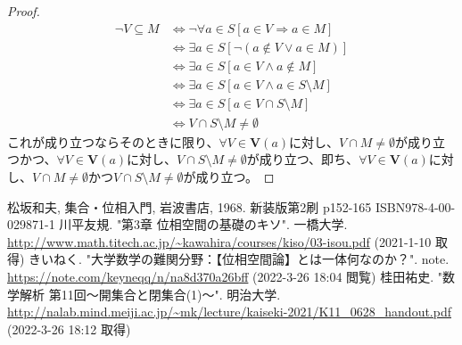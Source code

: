 \documentclass[dvipdfmx]{jsarticle}
\begin{document}
\begin{proof}
\begin{align*}
\neg V \subseteq M &\Leftrightarrow \neg\forall a \in S[ a \in V \Rightarrow a \in M]\\
&\Leftrightarrow \exists a \in S\left[ \neg(a \notin V \vee a \in M) \right]\\
&\Leftrightarrow \exists a \in S[ a \in V \land a \notin M]\\
&\Leftrightarrow \exists a \in S[ a \in V \land a \in S \setminus M]\\
&\Leftrightarrow \exists a \in S[ a \in V \cap S \setminus M]\\
&\Leftrightarrow V \cap S \setminus M \neq \emptyset
\end{align*}
これが成り立つならそのときに限り、$\forall V \in \mathbf{V}(a)$に対し、$V \cap M \neq \emptyset$が成り立つかつ、$\forall V \in \mathbf{V}(a)$に対し、$V \cap S \setminus M \neq \emptyset$が成り立つ、即ち、$\forall V \in \mathbf{V}(a)$に対し、$V \cap M \neq \emptyset$かつ$V \cap S \setminus M \neq \emptyset$が成り立つ。
\end{proof}
\begin{thebibliography}{50}
  松坂和夫, 集合・位相入門, 岩波書店, 1968. 新装版第2刷 p152-165 ISBN978-4-00-029871-1
  川平友規. "第3章 位相空間の基礎のキソ". 一橋大学. \url{http://www.math.titech.ac.jp/~kawahira/courses/kiso/03-isou.pdf} (2021-1-10 取得)
  きいねく. "大学数学の難関分野：【位相空間論】とは一体何なのか？". note. \url{https://note.com/keyneqq/n/na8d370a26bff} (2022-3-26 18:04 閲覧)
  桂田祐史. "数学解析 第11回～開集合と閉集合(1)～". 明治大学. \url{http://nalab.mind.meiji.ac.jp/~mk/lecture/kaiseki-2021/K11_0628_handout.pdf} (2022-3-26 18:12 取得)
\end{thebibliography}
\end{document}
